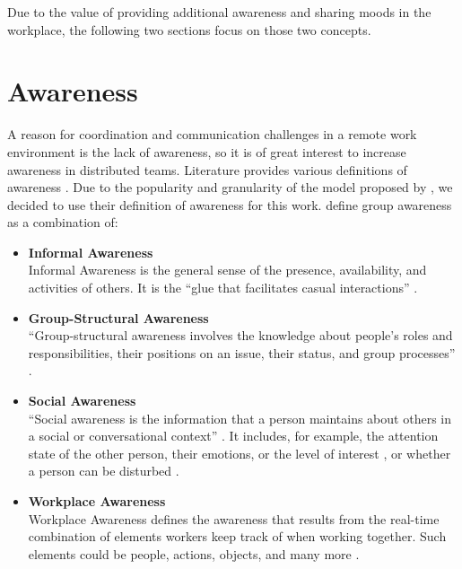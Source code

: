 Due to the value of providing additional awareness and sharing moods in the workplace, the following two sections focus on those two concepts.

\section{Awareness}
\label{section:awareness}
A reason for coordination and communication challenges in a remote work environment is the lack of awareness, so it is of great interest to increase awareness in distributed teams. Literature provides various definitions of awareness \autocite{chang2007out, gross2013supporting, gross2005user}. Due to the popularity and granularity of the model proposed by \textcite{gutwin1996workspace}, we decided to use their definition of awareness for this work. \textcite{gutwin1996workspace} define group awareness as a combination of:


\begin{itemize}[itemsep=0ex, parsep=0ex, leftmargin=*]
      \item \textbf{Informal Awareness} \\
            Informal Awareness is the general sense of the presence, availability, and activities of others. It is the \enquote{glue that facilitates casual interactions} \autocite[p.~6]{gutwin1996workspace}.
      \item \textbf{Group-Structural Awareness} \\
            \enquote{Group-structural awareness involves the knowledge about people’s roles and responsibilities, their positions on an issue, their status, and group processes} \autocite[p.~6]{gutwin1996workspace}.
      \item \textbf{Social Awareness} \\
            \enquote{Social awareness is the information that a person maintains about others in a social or conversational context} \autocite{gutwin1996workspace}. It includes, for example, the attention state of the other person, their emotions, or the level of interest \autocite[p.~6]{gutwin1996workspace}, or whether a person can be disturbed \autocite{gutwin1995support}.
      \item \textbf{Workplace Awareness} \\
            Workplace Awareness defines the awareness that results from the real-time combination of elements workers keep track of when working together. Such elements could be people, actions, objects, and many more \autocite{gutwin1995support}.
\end{itemize}

